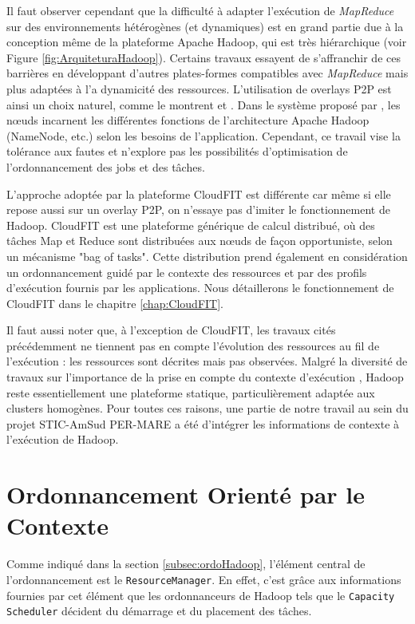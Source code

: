 Il faut observer cependant que la difficulté à adapter l'exécution de \textit{MapReduce} sur des environnements hétérogènes (et dynamiques) est en grand partie due à la conception même de la plateforme Apache Hadoop, qui est très hiérarchique (voir Figure \ref{fig:ArquiteturaHadoop}). Certains travaux essayent de s'affranchir de ces barrières en développant d'autres plates-formes compatibles avec \textit{MapReduce} mais plus adaptées à l'a dynamicité des ressources.  L'utilisation de overlays P2P est ainsi un choix naturel, comme le montrent \cite{Marozzo2012} et \cite{Steffenel20151034}. Dans le système proposé par \cite{Marozzo2012}, les n{\oe}uds incarnent les différentes fonctions de l'architecture Apache Hadoop (NameNode, etc.) selon les besoins de l'application. Cependant, ce travail vise la tolérance aux fautes et n'explore pas les possibilités d'optimisation de l'ordonnancement des jobs et des tâches. 

L'approche adoptée par la plateforme CloudFIT \cite{Steffenel20151034} est différente car même si elle repose aussi sur un overlay P2P, on n'essaye pas d'imiter le fonctionnement de Hadoop. CloudFIT est une plateforme générique de calcul distribué, où des tâches Map et Reduce sont distribuées aux n{\oe}uds de façon opportuniste, selon un mécanisme "bag of tasks". Cette distribution prend également en considération un ordonnancement guidé par le contexte des ressources et par des profils d'exécution fournis par les applications. Nous détaillerons le fonctionnement de CloudFIT dans le chapitre \ref{chap:CloudFIT}.

Il faut aussi noter que, à l'exception de CloudFIT, les travaux cités précédemment ne tiennent pas en compte l'évolution des ressources au fil de l'exécution : les ressources sont décrites mais pas observées. Malgré la diversité de travaux sur l'importance de la prise en compte du contexte d'exécution \cite{Baldauf, Maamar, Ramakrishnan2014, Najar2015}, Hadoop reste essentiellement une plateforme statique, particulièrement adaptée aux clusters homogènes. Pour toutes ces raisons, une partie de notre travail au sein du projet STIC-AmSud PER-MARE a été d'intégrer les informations de contexte à l'exécution de Hadoop.

\section{Ordonnancement Orienté par le Contexte} \label{sec:desenv}

Comme indiqué dans la section \ref{subsec:ordoHadoop}, l'élément central de l'ordonnancement est le \texttt{ResourceManager}. En effet, c'est grâce aux informations fournies par cet élément que les ordonnanceurs de Hadoop tels que le \texttt{Capacity Scheduler} décident du démarrage et du placement des tâches. 

